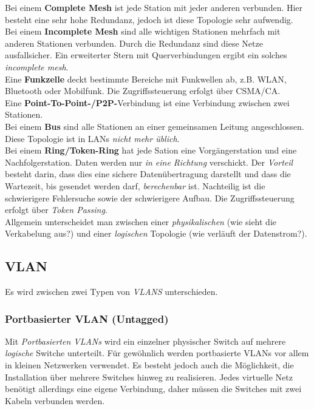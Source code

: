 \documentclass[a4paper, 12pt]{report}
\begin{document}
\begin{multicols}{2}
Bei einem \textbf{Complete Mesh} ist jede Station mit jeder anderen verbunden.
Hier besteht eine sehr hohe Redundanz, jedoch ist diese Topologie sehr
aufwendig. \\

Bei einem \textbf{Incomplete Mesh} sind alle wichtigen Stationen mehrfach mit
anderen Stationen verbunden. Durch die Redundanz sind diese Netze ausfallsicher.
Ein erweiterter Stern mit Querverbindungen ergibt ein solches \emph{incomplete
mesh}. \\

Eine \textbf{Funkzelle} deckt bestimmte Bereiche  mit Funkwellen ab, z.B.
WLAN, Bluetooth oder Mobilfunk. Die Zugriffssteuerung erfolgt über CSMA/CA. \\

Eine \textbf{Point-To-Point-/P2P-}Verbindung ist eine Verbindung zwischen zwei
Stationen. \\

Bei einem \textbf{Bus} sind alle Stationen an einer gemeinsamen Leitung
angeschlossen. Diese Topologie ist in LANs \emph{nicht mehr üblich}. \\

Bei einem \textbf{Ring/Token-Ring} hat jede Sation eine Vorgängerstation und
eine Nachfolgerstation. Daten werden nur \emph{in eine Richtung} verschickt.
Der \emph{Vorteil} besteht darin, dass dies eine sichere Datenübertragung
darstellt und dass die Wartezeit, bis gesendet werden darf, \emph{berechenbar}
ist. Nachteilig ist die schwierigere Fehlersuche sowie der schwierigere Aufbau.
Die Zugriffssteuerung erfolgt über \emph{Token Passing}. \\

Allgemein unterscheidet man zwischen einer \emph{physikalischen} (wie sieht die
Verkabelung aus?) und einer \emph{logischen} Topologie (wie verläuft der
Datenstrom?).

\subsection{VLAN}

Es wird zwischen zwei Typen von \emph{VLANS} unterschieden.


\subsubsection{Portbasierter VLAN (Untagged)}

Mit \emph{Portbasierten VLANs} wird ein einzelner physischer Switch auf mehrere
\emph{logische} Switche unterteilt. Für gewöhnlich werden portbasierte VLANs vor
allem in kleinen Netzwerken verwendet. Es besteht jedoch auch die Möglichkeit,
die Installation über mehrere Switches hinweg zu realisieren. Jedes virtuelle
Netz benötigt allerdings eine eigene Verbindung, daher müssen die Switches mit
zwei Kabeln verbunden werden.


\end{multicols}
\end{document}
